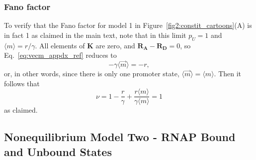 \subsubsection{Fano factor}
To verify that the Fano factor for model 1 in
Figure~\ref{fig2:constit_cartoons}(A) is in fact 1 as claimed in the main text,
note that in this limit $p_U = 1$ and $\langle{m}\rangle = r/\gamma$. All
elements of $\mathbf{K}$ are zero, and $\mathbf{R_A}-\mathbf{R_D} = 0$, so
Eq.~\ref{eq:vecm_appdx_ref} reduces to
\begin{equation}
- \gamma \langle\vec{m}\rangle = - r,
\end{equation}
or, in other words, since there is only one promoter state,
$\langle\vec{m}\rangle = \langle{m}\rangle$. Then it follows that
\begin{equation}
\nu = 1 -\frac{r}{\gamma}
    + \frac{r \langle{m}\rangle}{\gamma \langle{m}\rangle}
= 1
\end{equation}
as claimed.

\subsection{Nonequilibrium Model Two - RNAP Bound and Unbound States}
